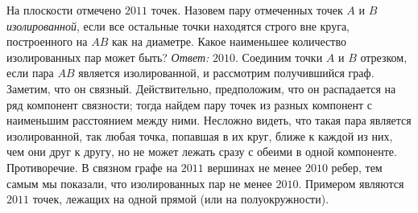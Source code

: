 \problem
На плоскости отмечено $2011$ точек.
Назовем пару отмеченных точек $A$ и $B$ \emph{изолированной}, если все остальные
точки находятся строго вне круга, построенного на $AB$ как на диаметре.
Какое наименьшее количество изолированных пар может быть?
\solution
\emph{Ответ:} $2010$.
Соединим точки $A$ и $B$ отрезком, если пара $AB$ является изолированной, и
рассмотрим получившийся граф.
Заметим, что он связный.
Действительно, предположим, что он распадается на ряд компонент связности;
тогда найдем пару точек из разных компонент с наименьшим расстоянием между
ними.
Несложно видеть, что такая пара является изолированной, так любая точка,
попавшая в их круг, ближе к каждой из них, чем они друг к другу, но не может
лежать сразу с обеими в одной компоненте.
Противоречие.
В связном графе на $2011$ вершинах не менее $2010$ ребер, тем самым мы
показали, что изолированных пар не менее $2010$.
Примером являются $2011$ точек, лежащих на одной прямой (или на
полуокружности).
\endproblem
